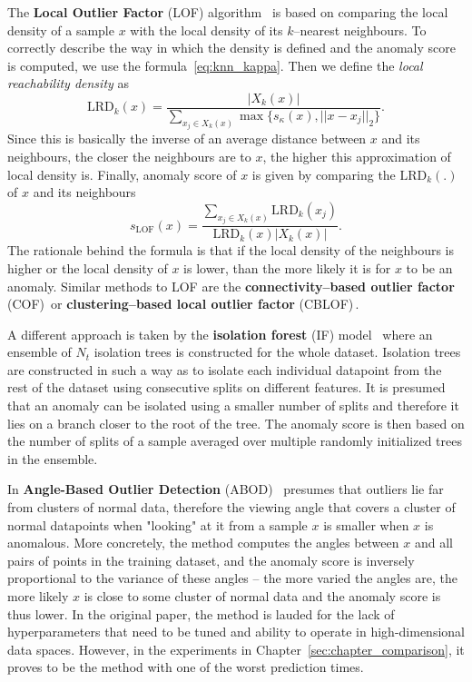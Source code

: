 The \textbf{Local Outlier Factor} (LOF) algorithm~\cite{breunig2000lof} is based on comparing the local density of a sample $x$ with the local density of its $k$--nearest neighbours. To correctly describe the way in which the density is defined and the anomaly score is computed, we use the formula~\eqref{eq:knn_kappa}. Then we define the \textit{local reachability density} as 
\begin{equation}
  \text{LRD}_k(x)=\frac{|X_k(x)|}{\sum_{x_j\in X_k(x)} \max \lbrace s_{\kappa}(x), \vert \vert x - x_j \vert \vert_2 \rbrace }.
\end{equation}
Since this is basically the inverse of an average distance between $x$ and its neighbours, the closer the neighbours are to $x$, the higher this approximation of local density is. Finally, anomaly score of $x$ is given by comparing the $\text{LRD}_k(.)$ of $x$ and its neighbours 
\begin{equation}
  s_{\text{LOF}}(x)=\frac{\sum_{x_j\in X_k(x)} \text{LRD}_k(x_j)}{\text{LRD}_k(x) |X_k(x)|}.
\end{equation}
The rationale behind the formula is that if the local density of the neighbours is higher or the local density of $x$ is lower, than the more likely it is for $x$ to be an anomaly. Similar methods to LOF are the \textbf{connectivity--based outlier factor} (COF)\,\cite{tang2002enhancing} or \textbf{clustering--based local outlier factor} (CBLOF)\,\cite{he2003discovering}.

A different approach is taken by the \textbf{isolation forest }(IF) model~\cite{liu2008isolation} where an ensemble of $N_t$ isolation trees is constructed for the whole dataset. Isolation trees are constructed in such a way as to isolate each individual datapoint from the rest of the dataset using consecutive splits on different features. It is presumed that an anomaly can be isolated using a smaller number of splits and therefore it lies on a branch closer to the root of the tree. The anomaly score is then based on the number of splits of a sample averaged over multiple randomly initialized trees in the ensemble.

In \textbf{Angle-Based Outlier Detection} (ABOD)~\cite{kriegel2008angle} presumes that outliers lie far from clusters of normal data, therefore the viewing angle that covers a cluster of normal datapoints when "looking" at it from a sample $x$ is smaller when $x$ is anomalous. More concretely, the method computes the angles between $x$ and all pairs of points in the training dataset, and the anomaly score is inversely proportional to the variance of these angles -- the more varied the angles are, the more likely $x$ is close to some cluster of normal data and the anomaly score is thus lower. In the original paper, the method is lauded for the lack of hyperparameters that need to be tuned and ability to operate in high-dimensional data spaces. However, in the experiments in Chapter~\ref{sec:chapter_comparison}, it proves to be the method with one of the worst prediction times.

